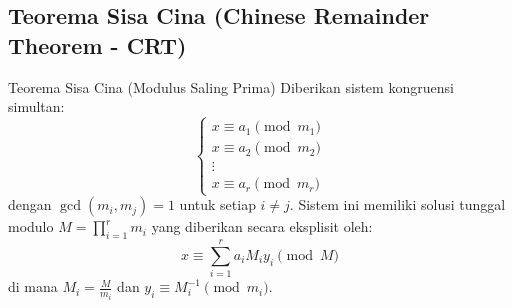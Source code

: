 \documentclass[11pt,a4paper]{article}
\begin{document}
\subsection{Teorema Sisa Cina (Chinese Remainder Theorem - CRT)}
\begin{thmbox}{Teorema Sisa Cina (Modulus Saling Prima)}
Diberikan sistem kongruensi simultan:
\[
\begin{cases}
x \equiv a_1 \pmod{m_1} \\
x \equiv a_2 \pmod{m_2} \\
\vdots \\
x \equiv a_r \pmod{m_r}
\end{cases}
\]
dengan $\gcd(m_i, m_j) = 1$ untuk setiap $i \neq j$. Sistem ini memiliki solusi tunggal modulo $M = \prod_{i=1}^r m_i$ yang diberikan secara eksplisit oleh:
\[
x \equiv \sum_{i=1}^r a_i M_i y_i \pmod M
\]
di mana $M_i = \frac{M}{m_i}$ dan $y_i \equiv M_i^{-1} \pmod{m_i}$.
\end{thmbox}
\end{document}
